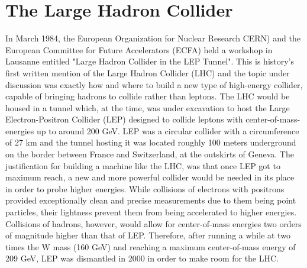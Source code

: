 \section{The Large Hadron Collider}
In March 1984, the European Organization for Nuclear Research CERN) and the European Committee for Future Accelerators (ECFA) 
held a workshop in Lausanne entitled "Large Hadron Collider in the LEP Tunnel". 
This is history's first written mention of the Large Hadron Collider (LHC) and the topic under discussion 
was exactly how and where to build a new type of high-energy collider, capable of bringing hadrons
to collide rather than leptons.
The LHC would be housed in a tunnel which, at the time, was under excavation to host the Large Electron-Positron Collider (LEP) designed to collide leptons with center-of-mass-energies up to around 200 GeV.
LEP was a circular collider with a circumference of 27 km and the tunnel hosting it was located roughly 100 meters underground on the border between France and Switzerland, at the outskirts of Geneva. 
The justification for building a machine like the LHC, was that once LEP got to maximum reach, a new and more powerful collider would be needed in its place in order to probe higher energies.
While collisions of electrons with positrons provided exceptionally clean and precise measurements due to them being point particles,
 their lightness prevent them from being accelerated to higher energies. Collisions of hadrons, however, would allow for center-of-mass energies two orders of magnitude higher than that of LEP. Therefore, after running a while at two times the W mass (160 GeV) and reaching a maximum center-of-mass energy of 209 GeV, LEP was dismantled in 2000 in order to make room for the LHC.
 
